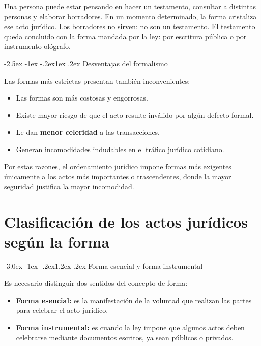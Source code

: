 \documentclass[12pt,oneside]{book}
\makeatletter
\renewcommand\section{\@startsection{section}{1}{\z@}%
  {-3.0ex \@plus -1ex \@minus -.2ex}{1.2ex \@plus .2ex}%
  {\normalfont\large\bfseries\color{acento}}}
\renewcommand\subsection{\@startsection{subsection}{2}{\z@}%
  {-2.5ex \@plus -1ex \@minus -.2ex}{1ex \@plus .2ex}%
  {\normalfont\normalsize\bfseries}}
\makeatother
\begin{document}
\begin{ejemplo}
Una persona puede estar pensando en hacer un testamento, consultar a distintas personas y elaborar borradores. En un momento determinado, la forma cristaliza ese acto jurídico. Los borradores no sirven: no son un testamento. El testamento queda concluido con la forma mandada por la ley: por escritura pública o por instrumento ológrafo.
\end{ejemplo}

\subsection{Desventajas del formalismo}

Las formas más estrictas presentan también inconvenientes:

\begin{itemize}
    \item Las formas son más costosas y engorrosas.
    \item Existe mayor riesgo de que el acto resulte inválido por algún defecto formal.
    \item Le dan \textbf{menor celeridad} a las transacciones.
    \item Generan incomodidades indudables en el tráfico jurídico cotidiano.
\end{itemize}

Por estas razones, el ordenamiento jurídico impone formas más exigentes únicamente a los actos más importantes o trascendentes, donde la mayor seguridad justifica la mayor incomodidad.


\chapter{Clasificación de los actos jurídicos según la forma}

\section{Forma esencial y forma instrumental}

Es necesario distinguir dos sentidos del concepto de forma:

\begin{itemize}
    \item \textbf{Forma esencial:} es la manifestación de la voluntad que realizan las partes para celebrar el acto jurídico.
    \item \textbf{Forma instrumental:} es cuando la ley impone que algunos actos deben celebrarse mediante documentos escritos, ya sean públicos o privados.
\end{itemize}
\end{document}
